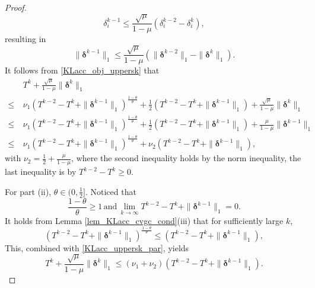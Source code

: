 \documentclass[twoside,11pt]{article}
\numberwithin{equation}{section}
\begin{document}
\begin{proof}
   \begin{equation} \label{eps_delta_item_ineq}
      \delta_{i}^{k-1}\le \frac{\sqrt{\mu}}{1-\mu} ( \delta_{i}^{k-2}- \delta_{i}^{k}),
   \end{equation}
   resulting in 
   \begin{equation}\label{ineq_norm_delta}
     \|\bm{\delta}^{k-1}\|_{1}\le \frac{\sqrt{\mu}}{1-\mu} (\|\bm{\delta}^{k-2}\|_{1}-\|\bm{\delta}^{k}\|_{1}).
   \end{equation}
 It follows from \eqref{KLacc_obj_uppersk}   that 
 \begin{equation}\label{KLacc_uppersk_par}
    \begin{aligned}
        &\ T^{k}+\frac{\sqrt{\mu}}{1-\mu}\|\bm{\delta}^{k}\|_{1} \\
    \le &\ \nu_{1}  \left(T^{k-2}-T^{k}+\|\bm{\delta}^{k-1}\|_{1}\right)^{\frac{1-\theta}{\theta}} + \frac{1}{2} \left(T^{k-2}-T^{k}+\|\bm{\delta}^{k-1}\|_{1}\right)+\frac{\sqrt{\mu}}{1-\mu}\|\bm{\delta}^{k}\|_{1}\\
    \le &\ \nu_{1}  \left(T^{k-2}-T^{k}+\|\bm{\delta}^{k-1}\|_{1}\right)^{\frac{1-\theta}{\theta}} + \frac{1}{2} \left(T^{k-2}-T^{k}+\|\bm{\delta}^{k-1}\|_{1}\right)+\frac{\mu}{1-\mu}\|\bm{\delta}^{k-1}\|_{1}\\
    \le &\ \nu_{1}  \left(T^{k-2}-T^{k}+\|\bm{\delta}^{k-1}\|_{1}\right)^{\frac{1-\theta}{\theta}} + \nu_{2} \left(T^{k-2}-T^{k}+\|\bm{\delta}^{k-1}\|_{1}\right),
 \end{aligned} \end{equation}
 with $\nu_{2} = \frac{1}{2}+\frac{\mu}{1-\mu} $, where the second inequality holds by the norm inequality, the last inequality is by $T^{k-2}-T^{k} \ge 0$.
 
 For part (ii), $\theta\in (0,\frac{1}{2}]$. Noticed that 
 \begin{equation*}
   \frac{1-\theta}{\theta}\ge 1 \,\text{and}\, \lim\limits_{k\to\infty}T^{k-2}-T^{k}+\|\bm{\delta}^{k-1}\|_{1} =0. 
 \end{equation*}
 It holds from Lemma \ref{lem_KLacc_cvgc_cond}(iii)   that for sufficiently large $k$, 
 \begin{equation}
    \left(T^{k-2}-T^{k}+\|\bm{\delta}^{k-1}\|_{1}\right)^{\frac{1-\theta}{\theta}} \le  \left( T^{k-2}-T^{k}+\|\bm{\delta}^{k-1}\|_{1}\right),
 \end{equation}  
  This, combined with \eqref{KLacc_uppersk_par}, yields
 \begin{equation}
   T^{k}+\frac{\sqrt{\mu}}{1-\mu}\|\bm{\delta}^{k}\|_{1} \le  (\nu_{1}+\nu_{2}) \left(T^{k-2}-T^{k}+\|\bm{\delta}^{k-1}\|_{1}\right).
 \end{equation}
 

\end{proof}
\end{document}
